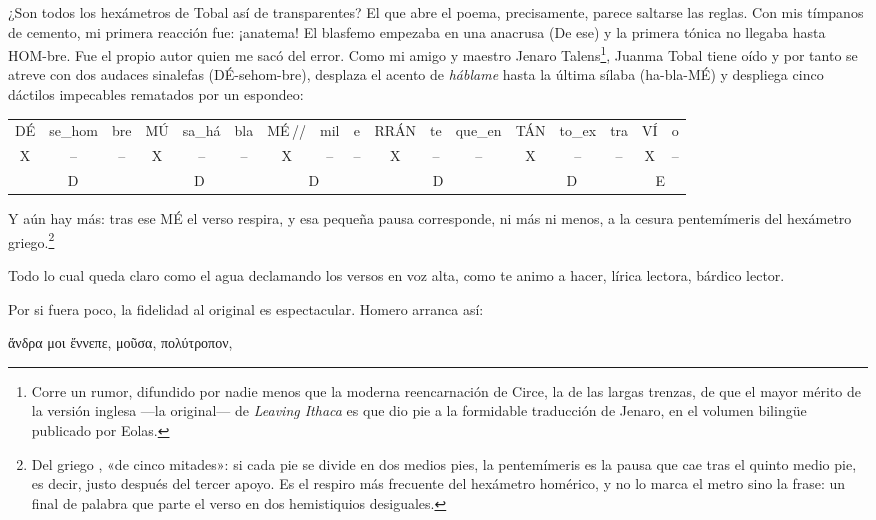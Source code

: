 ¿Son todos los hexámetros de Tobal así de transparentes? El que abre el poema, precisamente, parece saltarse las reglas. Con mis tímpanos de cemento, mi primera reacción fue: ¡anatema! El blasfemo empezaba en una anacrusa (De ese) y la primera tónica no llegaba hasta HOM-bre. Fue el propio autor quien me sacó del error. Como mi amigo y maestro Jenaro Talens\footnote{Corre un rumor, difundido por nadie menos que la moderna reencarnación de Circe, la de las largas trenzas, de que el mayor mérito de la versión inglesa ---la original--- de \emph{Leaving Ithaca} es que dio pie a la formidable traducción de Jenaro, en el volumen bilingüe publicado por Eolas.}, Juanma Tobal tiene oído y por tanto se atreve con dos audaces sinalefas (DÉ-sehom-bre), desplaza el acento de \emph{háblame} hasta la última sílaba (ha-bla-MÉ) y despliega cinco dáctilos impecables rematados por un espondeo:

\begin{center}
\small\setlength{\tabcolsep}{3pt}
\begin{tabular}{ccc|ccc|ccc|ccc|ccc|cc}
DÉ & se\_hom & bre & MÚ & sa\_há & bla & MÉ\,// & mil & e & RRÁN & te & que\_en & TÁN & to\_ex & tra & VÍ & o \\
X & -- & -- & X & -- & -- & X & -- & -- & X & -- & -- & X & -- & -- & X & -- \\
\multicolumn{3}{c|}{D} & \multicolumn{3}{c|}{D} & \multicolumn{3}{c|}{D} & \multicolumn{3}{c|}{D} & \multicolumn{3}{c|}{D} & \multicolumn{2}{c}{E} \\
\end{tabular}
\end{center}

Y aún hay más: tras ese MÉ el verso respira, y esa pequeña pausa corresponde, ni más ni menos, a la cesura pentemímeris del hexámetro griego.\footnote{Del griego , «de cinco mitades»: si cada pie se divide en dos medios pies, la pentemímeris es la pausa que cae tras el quinto medio pie, es decir, justo después del tercer apoyo. Es el respiro más frecuente del hexámetro homérico, y no lo marca el metro sino la frase: un final de palabra que parte el verso en dos hemistiquios desiguales.}

Todo lo cual queda claro como el agua declamando los versos en voz alta, como te animo a hacer, lírica lectora, bárdico lector.

Por si fuera poco, la fidelidad al original es espectacular. Homero arranca así:

\begin{versocita}
\foreignlanguage{greek}{ἄνδρα μοι ἔννεπε, μοῦσα, πολύτροπον,}
\end{versocita}

